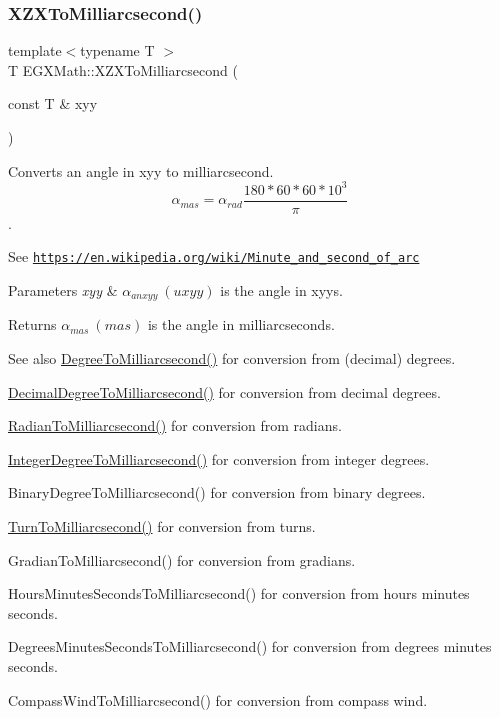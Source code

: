 \subsubsection{\texorpdfstring{X\+Z\+X\+To\+Milliarcsecond()}{XZXToMilliarcsecond()}}
{\footnotesize\ttfamily template$<$typename T $>$ \\
T E\+G\+X\+Math\+::\+X\+Z\+X\+To\+Milliarcsecond (\begin{DoxyParamCaption}\item[{const T \&}]{xyy }\end{DoxyParamCaption})}



Converts an angle in xyy to milliarcsecond. \[\alpha_{mas}=\alpha_{rad}\frac{180 * 60 * 60 * 10^3}{\pi}\]. 

See \href{https://en.wikipedia.org/wiki/Minute_and_second_of_arc}{\tt https\+://en.\+wikipedia.\+org/wiki/\+Minute\+\_\+and\+\_\+second\+\_\+of\+\_\+arc} 
\begin{DoxyParams}{Parameters}
{\em xyy} & $\alpha_{anxyy}\ (uxyy)$ is the angle in xyys. \\
\hline
\end{DoxyParams}
\begin{DoxyReturn}{Returns}
$\alpha_{mas}\ (mas)$ is the angle in milliarcseconds. 
\end{DoxyReturn}
\begin{DoxySeeAlso}{See also}
\mbox{\hyperlink{group___e_g_x_math-_angle_conversions-_degree_ga2c218e286b2ef72a00734dbc5a7f5ab6}{Degree\+To\+Milliarcsecond()}} for conversion from (decimal) degrees. 

\mbox{\hyperlink{group___e_g_x_math-_angle_conversions-_decimal_degree_gadb9ff3c92cf7484793f91e7de80c222e}{Decimal\+Degree\+To\+Milliarcsecond()}} for conversion from decimal degrees. 

\mbox{\hyperlink{group___e_g_x_math-_angle_conversions-_radian_ga84fbb494a455cfeb30be62776f96c9a9}{Radian\+To\+Milliarcsecond()}} for conversion from radians. 

\mbox{\hyperlink{group___e_g_x_math-_angle_conversions-_integer_degree_gadc43f22e832cd8fcf16b7bd2269ae348}{Integer\+Degree\+To\+Milliarcsecond()}} for conversion from integer degrees. 

Binary\+Degree\+To\+Milliarcsecond() for conversion from binary degrees. 

\mbox{\hyperlink{group___e_g_x_math-_angle_conversions-_turn_ga05d6fea8f8475831e93dd23f6196393f}{Turn\+To\+Milliarcsecond()}} for conversion from turns. 

Gradian\+To\+Milliarcsecond() for conversion from gradians. 

Hours\+Minutes\+Seconds\+To\+Milliarcsecond() for conversion from hours minutes seconds. 

Degrees\+Minutes\+Seconds\+To\+Milliarcsecond() for conversion from degrees minutes seconds. 

Compass\+Wind\+To\+Milliarcsecond() for conversion from compass wind. 
\end{DoxySeeAlso}
